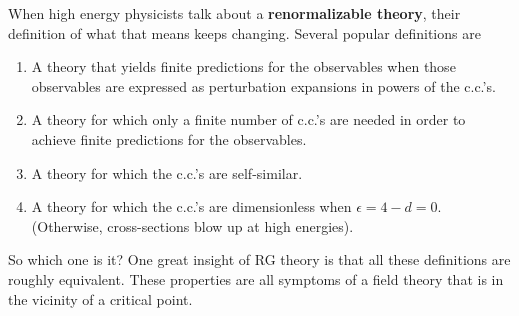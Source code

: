 When high energy physicists
talk about a \textbf{renormalizable theory},
their definition
of what that means keeps changing.
Several popular definitions are
\begin{enumerate}
\item
A theory that yields finite
predictions for the observables
when those observables are expressed
as perturbation
expansions in powers of the c.c.'s.
\item
A theory for which only
a finite number of c.c.'s are needed
in order to achieve finite predictions
for the observables.
\item
A theory for which the c.c.'s are self-similar.
\item
A theory for which the
c.c.'s are dimensionless
when $\epsilon=4-d=0$. (Otherwise,
cross-sections blow up at high energies).
\end{enumerate}
So which one is it?
One great insight of RG theory is
that all these definitions are
roughly equivalent. These
properties
are all symptoms of
a field theory that is in the
vicinity of a critical point.

